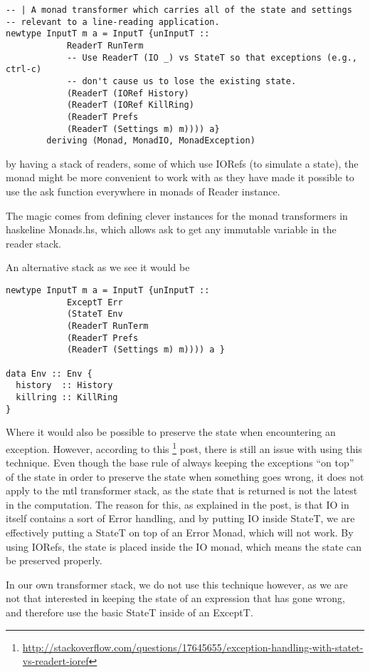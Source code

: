 \documentclass[11pt,a4paper]{article}
\begin{document}
\begin{verbatim}
-- | A monad transformer which carries all of the state and settings
-- relevant to a line-reading application.
newtype InputT m a = InputT {unInputT ::
            ReaderT RunTerm
            -- Use ReaderT (IO _) vs StateT so that exceptions (e.g., ctrl-c)
            -- don't cause us to lose the existing state.
            (ReaderT (IORef History)
            (ReaderT (IORef KillRing)
            (ReaderT Prefs
            (ReaderT (Settings m) m)))) a}
        deriving (Monad, MonadIO, MonadException)
\end{verbatim}

by having a stack of readers, some of which use IORefs (to simulate a state), the
monad might be more convenient to work with as they have made it possible to
use the ask function everywhere in monads of Reader instance.

The magic comes from defining clever instances for the monad transformers in
haskeline Monads.hs, which allows ask to get any immutable variable in the
reader stack.

An alternative stack as we see it would be

\begin{verbatim}
newtype InputT m a = InputT {unInputT ::
            ExceptT Err
            (StateT Env
            (ReaderT RunTerm
            (ReaderT Prefs
            (ReaderT (Settings m) m)))) a }

data Env :: Env {
  history  :: History
  killring :: KillRing
}
\end{verbatim}

Where it would also be possible to preserve the state when encountering an
exception. However, according to this
\footnote{\url{http://stackoverflow.com/questions/17645655/exception-handling-with-statet-vs-readert-ioref}}
post, there is still an issue with using this technique. Even though the base
rule of always keeping the exceptions ``on top'' of the state in order to
preserve the state when something goes wrong, it does not apply to the mtl
transformer stack, as the state that is returned is not the latest in the
computation. The reason for this, as explained in the post, is that IO in
itself contains a sort of Error handling, and by putting IO inside StateT, we
are effectively putting a StateT on top of an Error Monad, which will not work.
By using IORefs, the state is placed inside the IO monad, which means the state
can be preserved properly.

In our own transformer stack, we do not use this technique however, as we are
not that interested in keeping the state of an expression that has gone wrong,
and therefore use the basic StateT inside of an ExceptT.
\end{document}
